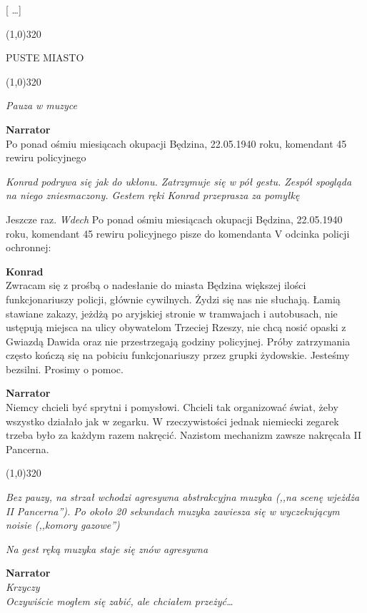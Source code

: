\documentclass[11pt,a4paper,oneside]{article}
\begin{document}
{\color{red} [ \dots{}]}

\line(1,0){320}

{\color{red}
PUSTE MIASTO
}

\line(1,0){320}

{\color{light-gray} \emph{Pauza w muzyce}}

\textbf{Narrator}\\
Po ponad ośmiu miesiącach okupacji Będzina, 22.05.1940 roku, komendant 45
rewiru policyjnego

{\color{light-gray} \emph{Konrad podrywa się jak do ukłonu. Zatrzymuje
się w pół gestu. Zespół spogląda na niego zniesmaczony. Gestem ręki
Konrad przeprasza za pomyłkę}}

Jeszcze raz. {\color{light-gray} \emph{Wdech}} Po ponad ośmiu
miesiącach okupacji Będzina, 22.05.1940 roku, komendant 45 rewiru
policyjnego pisze do komendanta V odcinka policji ochronnej:

{\color{konrad}
\textbf{Konrad}\\
Zwracam się z prośbą o nadesłanie do miasta Będzina większej ilości
funkcjonariuszy policji, głównie cywilnych. Żydzi się nas nie słuchają. Łamią
stawiane zakazy, jeżdżą po aryjskiej stronie w tramwajach i autobusach, nie
ustępują miejsca na ulicy obywatelom Trzeciej Rzeszy, nie chcą nosić opaski
z Gwiazdą Dawida oraz nie przestrzegają godziny policyjnej. Próby zatrzymania
często kończą się na pobiciu funkcjonariuszy przez grupki żydowskie. Jesteśmy 
bezsilni. Prosimy o pomoc.
}

\textbf{Narrator}\\
Niemcy chcieli być sprytni i pomysłowi. Chcieli tak organizować świat,
żeby wszystko działało jak w zegarku. W rzeczywistości jednak
niemiecki zegarek trzeba było za każdym razem nakręcić. Nazistom
mechanizm zawsze nakręcała II Pancerna. 

\line(1,0){320}

{\color{light-gray} \emph{Bez pauzy, na strzał wchodzi agresywna
abstrakcyjna muzyka (,,na scenę wjeżdża II Pancerna''). Po około 20
sekundach muzyka zawiesza się w wyczekującym noisie (,,komory
gazowe'')}}

{\color{light-gray} \emph{Na gest ręką muzyka staje się znów agresywna}}

\textbf{Narrator}\\
{\color{light-gray} \emph{Krzyczy}}\\
\emph{Oczywiście mogłem się zabić, ale chciałem przeżyć\dots{}} 
\end{document}
